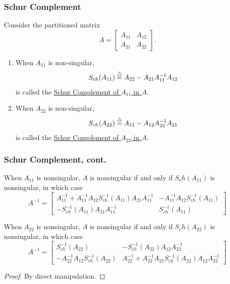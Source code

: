 \documentclass{beamer}
\begin{document}
\begin{frame}\frametitle{Schur Complement}
	\begin{definition}
		Consider the partitioned matrix
		\[
		A = \begin{bmatrix} A_{11} & A_{12} \\ A_{21} & A_{22} \end{bmatrix}.
		\]	
		\begin{enumerate}
			\item When $A_{11}$ is non-singular, 
				\[ S_{ch}(A_{11}) \stackrel{\triangle}{=} A_{22} - A_{21}A_{11}^{-1}A_{12} \]
				is called the \underline{Schur Complement of $A_{11}$ in $A$}.
			\item When $A_{22}$ is non-singular, 
				\[ S_{ch}(A_{22}) \stackrel{\triangle}{=} A_{11} - A_{12}A_{22}^{-1}A_{21} \]
				is called the \underline{Schur Complement of $A_{22}$ in $A$}.
		\end{enumerate}
	\end{definition}
\end{frame}

\begin{frame}\frametitle{Schur Complement, cont.}
	\begin{lemma}
	When $A_{11}$ is nonsingular, $A$ is nonsingular if and only if $S_ch(A_{11})$ is nonsingular, in which case
	\[
	A^{-1} = \begin{bmatrix}
				A_{11}^{-1} + A_{11}^{-1}A_{12}S_{ch}^{-1}(A_{11})A_{21}A_{11}^{-1} &
				-A_{11}^{-1}A_{12}S_{ch}^{-1}(A_{11}) \\
				-S_{ch}^{-1}(A_{11})A_{21}A_{11}^{-1} &
				S_{ch}^{-1}(A_{11})
 			 \end{bmatrix}
	\]	
	\end{lemma}
	\begin{lemma}
	When $A_{22}$ is nonsingular, $A$ is nonsingular if and only if $S_ch(A_{22})$ is nonsingular, in which case
	\[
	A^{-1} = \begin{bmatrix}
				S_{ch}^{-1}(A_{22}) &
				-S_{ch}^{-1}(A_{22})A_{12}A_{22}^{-1} \\
				-A_{22}^{-1}A_{12}S_{ch}^{-1}(A_{22}) &
				A_{22}^{-1} + A_{22}^{-1}A_{21}S_{ch}^{-1}(A_{22})A_{12}A_{22}^{-1} 
 			 \end{bmatrix}
	\]	
	\end{lemma}
	\begin{proof}
	By direct manipulation.	
	\end{proof}
\end{frame}
\end{document}
